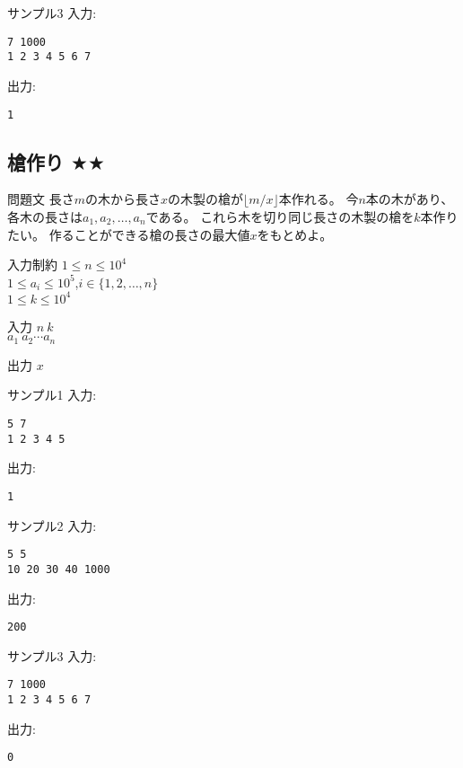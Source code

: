 \documentclass[a4paper,twoside,onecolumn,openany,article,10pt]{memoir}
\theoremstyle{remark}
\begin{document}
\begin{itembox}[l]{サンプル3}
入力:
\begin{verbatim}
7 1000
1 2 3 4 5 6 7
\end{verbatim}
出力:
\begin{verbatim}
1
\end{verbatim}
\end{itembox}


\clearpage
\subsection{槍作り $\bigstar\bigstar$}
\begin{itembox}[l]{問題文}
長さ$m$の木から長さ$x$の木製の槍が$\lfloor m/x\rfloor$本作れる。
今$n$本の木があり、各木の長さは$a_1,a_2,\dotsc,a_n$である。
これら木を切り同じ長さの木製の槍を$k$本作りたい。
作ることができる槍の長さの最大値$x$をもとめよ。
\end{itembox}

\begin{itembox}[l]{入力制約}
$1\le n\le 10^4$\\
$1\le a_i\le 10^5$,\hspace{2em}$i\in\{1,2,\dotsc,n\}$\\
$1\le k\le 10^4$
\end{itembox}

\begin{itembox}[l]{入力}
$n~k$\\
$a_1~a_2 \dotsb a_n$
\end{itembox}

\begin{itembox}[l]{出力}
$x$
\end{itembox}

\begin{itembox}[l]{サンプル1}
入力:
\begin{verbatim}
5 7
1 2 3 4 5
\end{verbatim}
出力:
\begin{verbatim}
1
\end{verbatim}
\end{itembox}

\begin{itembox}[l]{サンプル2}
入力:
\begin{verbatim}
5 5
10 20 30 40 1000
\end{verbatim}
出力:
\begin{verbatim}
200
\end{verbatim}
\end{itembox}

\begin{itembox}[l]{サンプル3}
入力:
\begin{verbatim}
7 1000
1 2 3 4 5 6 7
\end{verbatim}
出力:
\begin{verbatim}
0
\end{verbatim}
\end{itembox}
\end{document}
